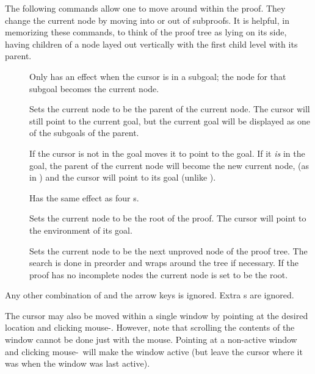 {} The following commands allow one to move around within the proof.  They
change the current node by moving into or out of subproofs.  It is helpful,
in memorizing these commands, to think of the proof tree as lying on its
side, having children of a node layed out vertically with the first child
level with its parent.
%
\begin {description}
\item [\RIGHT{}] \hfill \break
\noindent
    Only has an effect when the cursor is in a subgoal;
    the node for that subgoal becomes the current node.

\item [\LEFT{}] \hfill \break
\noindent
    Sets the current node to be the parent of the current node.
    The cursor will still point to the current goal, but the current goal
    will be displayed as one of the subgoals of the parent.

\item [\DIAG{}] \hfill \break
    If the cursor is not in the goal \DIAG{} moves it to point to
    the goal.  If it {\em is} in the goal, the parent of the current node will
    become the new current node, (as in \LEFT{}) and the cursor will point to
    its goal (unlike \LEFT{}).

\item[\LONG{} \DIAG{}]{} \hfill \break
\noindent
    Has the same effect as four \DIAG{}s.

\item[\LONG{} \LONG{} \DIAG{}]{} \hfill \break
\noindent
    Sets the current node to be the root of the proof.
    The cursor will point to the environment of its goal.

\item[\LONG{} \RIGHT{}]{} \hfill \break
    Sets the current node to be the next unproved node of the proof tree.
    The search is done in preorder and wraps around the tree if necessary.
    If the proof has no incomplete nodes the current node is set to be the
    root.
\end {description}
%
Any other combination of \LONG{} and the arrow keys is ignored.
Extra \LONG{}s are ignored.

The cursor may also be moved within a single window by pointing at the
desired location and clicking mouse-\JUMP.  However, note that scrolling
the contents of the window cannot be done just with the mouse.  Pointing at
a non-active window and clicking mouse-\JUMP\ will make the window active
(but leave the cursor where it was when the window was last active).


